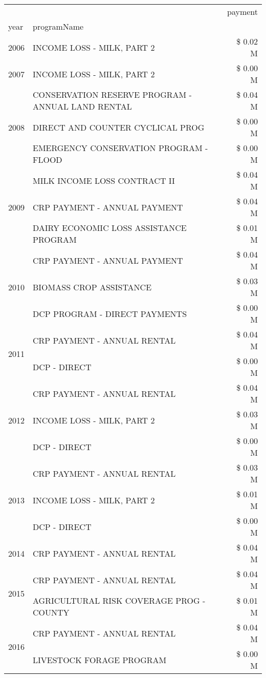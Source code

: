 \begin{tabular}{llr}
\toprule
 &  & payment \\
year & programName &  \\
\midrule
2006 & INCOME LOSS - MILK, PART 2 & \$ 0.02 M \\
\cline{1-3}
2007 & INCOME LOSS - MILK, PART 2 & \$ 0.00 M \\
\cline{1-3}
\multirow[t]{3}{*}{2008} & CONSERVATION RESERVE PROGRAM - ANNUAL LAND RENTAL & \$ 0.04 M \\
 & DIRECT AND COUNTER CYCLICAL PROG & \$ 0.00 M \\
 & EMERGENCY CONSERVATION PROGRAM - FLOOD & \$ 0.00 M \\
\cline{1-3}
\multirow[t]{3}{*}{2009} & MILK INCOME LOSS CONTRACT II & \$ 0.04 M \\
 & CRP PAYMENT - ANNUAL PAYMENT & \$ 0.04 M \\
 & DAIRY ECONOMIC LOSS ASSISTANCE PROGRAM & \$ 0.01 M \\
\cline{1-3}
\multirow[t]{3}{*}{2010} & CRP PAYMENT - ANNUAL PAYMENT & \$ 0.04 M \\
 & BIOMASS CROP ASSISTANCE & \$ 0.03 M \\
 & DCP PROGRAM - DIRECT PAYMENTS & \$ 0.00 M \\
\cline{1-3}
\multirow[t]{2}{*}{2011} & CRP PAYMENT - ANNUAL RENTAL & \$ 0.04 M \\
 & DCP - DIRECT & \$ 0.00 M \\
\cline{1-3}
\multirow[t]{3}{*}{2012} & CRP PAYMENT - ANNUAL RENTAL & \$ 0.04 M \\
 & INCOME LOSS - MILK, PART 2 & \$ 0.03 M \\
 & DCP - DIRECT & \$ 0.00 M \\
\cline{1-3}
\multirow[t]{3}{*}{2013} & CRP PAYMENT - ANNUAL RENTAL & \$ 0.03 M \\
 & INCOME LOSS - MILK, PART 2 & \$ 0.01 M \\
 & DCP - DIRECT & \$ 0.00 M \\
\cline{1-3}
2014 & CRP PAYMENT - ANNUAL RENTAL & \$ 0.04 M \\
\cline{1-3}
\multirow[t]{2}{*}{2015} & CRP PAYMENT - ANNUAL RENTAL & \$ 0.04 M \\
 & AGRICULTURAL RISK COVERAGE PROG - COUNTY & \$ 0.01 M \\
\cline{1-3}
\multirow[t]{3}{*}{2016} & CRP PAYMENT - ANNUAL RENTAL & \$ 0.04 M \\
 & LIVESTOCK FORAGE PROGRAM & \$ 0.00 M \\

\end{tabular}
